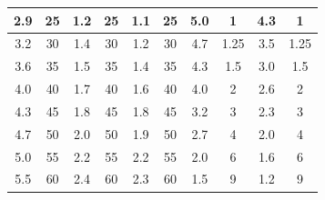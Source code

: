\documentclass[a4paper,12pt]{article} %
\begin{document}
\begin{center}
\begin{table}
\begin{tabular}{|c|c|c|c|c|c|c|c|c|c|}
            2.9                                        & 25                                         & 1.2                                       & 25                                         & 1.1                          & 25            & 5.0                          & 1             &  4.3  & 1     \\ \hline
            3.2                                        & 30                                         & 1.4                                       & 30                                         & 1.2                          & 30            & 4.7                          & 1.25          &  3.5  & 1.25  \\ \hline
            3.6                                        & 35                                         & 1.5                                       & 35                                         & 1.4                          & 35            & 4.3                          & 1.5           &  3.0  & 1.5   \\ \hline
            4.0                                        & 40                                         & 1.7                                       & 40                                         & 1.6                          & 40            & 4.0                          & 2             &  2.6  & 2     \\ \hline
            4.3                                        & 45                                         & 1.8                                       & 45                                         & 1.8                          & 45            & 3.2                          & 3             &  2.3  & 3     \\ \hline
            4.7                                        & 50                                         & 2.0                                       & 50                                         & 1.9                          & 50            & 2.7                          & 4             &  2.0  & 4     \\ \hline
            5.0                                        & 55                                         & 2.2                                       & 55                                         & 2.2                          & 55            & 2.0                          & 6             &  1.6  & 6     \\ \hline
            5.5                                        & 60                                         & 2.4                                       & 60                                         & 2.3                          & 60            & 1.5                          & 9             &  1.2  & 9     \\ \hline

\end{tabular}
\end{table}
\end{center}
\end{document}
